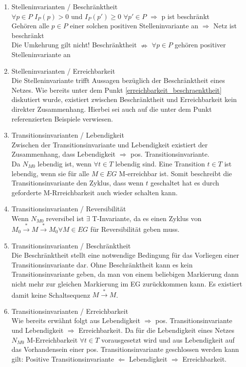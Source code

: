 \documentclass[10pt]{scrartcl}
\begin{document}
\begin{enumerate}
\item{Stelleninvarianten / Beschränktheit}\\
$\forall p \in P$ $I_{P}(p) > 0$ und $I_{P}(p')\geq 0$ $\forall p' \in P$ $\Rightarrow$ p ist beschränkt\\
Gehören alle $p \in P$ einer solchen positiven Stelleninvariante an $\Rightarrow$ Netz ist beschränkt\\
Die Umkehrung gilt nicht! Beschränktheit $\nRightarrow$ $\forall p \in P$ gehören positiver Stelleninvariante an

\item{Stelleninvarianten / Erreichbarkeit}\\
Die Stelleninvariante trifft Aussagen bezüglich der Beschränktheit eines Netzes.
Wie bereits unter dem Punkt \ref{erreichbarkeit_beschraenktheit} diskutiert wurde, existiert zwischen Beschränktheit und Erreichbarkeit kein direkter Zusammenhang.
Hierbei sei auch auf die unter dem Punkt referenzierten Beispiele verwiesen.

\item{Transitionsinvarianten / Lebendigkeit}\\
Zwischen der Transitionsinvariante und Lebendigkeit existiert der Zusammenhang, dass Lebendigkeit $\Rightarrow$ pos. Transitionsinvariante.\\
Da $N_{M0}$ lebendig ist, wenn $\forall t \in T$ lebendig sind.
Eine Transition $t \in T$ ist lebendig, wenn sie für alle $M \in EG$ M-erreichbar ist.
Somit beschreibt die Transitionsinvariante den Zyklus, dass wenn $t$ geschaltet hat es durch geforderte M-Rrreichbarkeit auch wieder schalten kann. 

\item{Transitionsinvarianten / Reversibilität}\\
Wenn $N_{M0}$ reversibel ist $\exists$ T-Invariante, da es einen Zyklus von $M_{0} \overset{*}{\rightarrow} M  \overset{*}{\rightarrow} M_{0}  \forall M \in EG$ für Reversibilität geben muss.

\item{Transitionsinvarianten / Beschränktheit}\\
Die Beschränktheit stellt eine notwendige Bedingung für das Vorliegen einer Transitionsinvariante dar.
Ohne Beschränktheit kann es kein Transitionsinvariante geben, da man von einem beliebigen Markierung dann nicht mehr zur gleichen Markierung im EG zurückkommen kann.
Es existiert damit keine Schaltsequenz $M \overset{*}{\rightarrow} M$.

\item{Transitionsinvarianten / Erreichbarkeit}\\
Wie bereits erwähnt folgt aus Lebendigkeit $\Rightarrow$ pos. Transitionsinvariante und Lebendigkeit $\Rightarrow$ Erreichbarkeit. 
Da für die Lebendigkeit eines Netzes $N_{M0}$ M-Erreichbarkeit $\forall t \in T$ vorausgesetzt wird und aus Lebendigkeit auf das Vorhandensein einer pos. Transitionsinvariante geschlossen werden kann gilt: Positive Transitionsinvariante $\Leftarrow$ Lebendigkeit $\Rightarrow$ Erreichbarkeit.


\end{enumerate}
\end{document}
